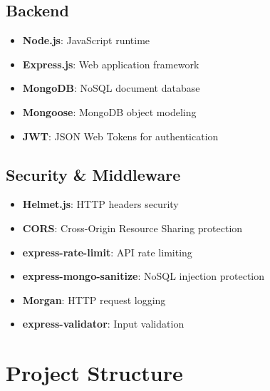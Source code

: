\documentclass[12pt]{article}
\begin{document}
\subsection{Backend}
\begin{itemize}
  \item \textbf{Node.js}: JavaScript runtime
  \item \textbf{Express.js}: Web application framework
  \item \textbf{MongoDB}: NoSQL document database
  \item \textbf{Mongoose}: MongoDB object modeling
  \item \textbf{JWT}: JSON Web Tokens for authentication
\end{itemize}

\subsection{Security \& Middleware}
\begin{itemize}
  \item \textbf{Helmet.js}: HTTP headers security
  \item \textbf{CORS}: Cross-Origin Resource Sharing protection
  \item \textbf{express-rate-limit}: API rate limiting
  \item \textbf{express-mongo-sanitize}: NoSQL injection protection
  \item \textbf{Morgan}: HTTP request logging
  \item \textbf{express-validator}: Input validation
\end{itemize}

\section{Project Structure}
\end{document}
